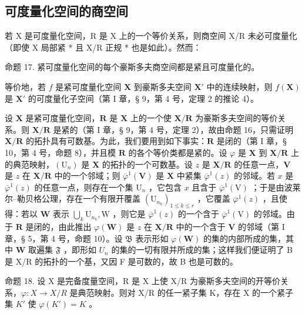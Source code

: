 \subsection{可度量化空间的商空间}

若 X 是可度量化空间，R 是 X 上的一个等价关系，则商空间 X/R 未必可度量化（即使 X 局部紧 * 且 X/R 正规 * 也是如此）。然而：

命题 17. 紧可度量化空间的每个豪斯多夫商空间都是紧且可度量化的。

等价地，若 \(f\) 是紧可度量化空间 \(\mathbf{X}\) 到豪斯多夫空间 \(\mathbf{X}'\) 中的连续映射，则 \(f(\mathbf{X})\) 是 \(\mathbf{X}'\) 的可度量化子空间（第 I 章，§ 9，第 4 号，定理 2 的推论 4）。

设 \(\mathbf{X}\) 是紧可度量化空间，\(\mathbf{R}\) 是 \(\mathbf{X}\) 上的一个使 \(\mathbf{X} / \mathbf{R}\) 为豪斯多夫空间的等价关系。则 \(\mathbf{X} / \mathbf{R}\) 是紧的（第 I 章，§ 9，第 4 号，定理 2），故由命题 16，只需证明 \(\mathbf{X} / \mathbf{R}\) 的拓扑具有可数基。为此，我们要用到如下事实：\(\mathbf{R}\) 是闭的（第 I 章，§ 10，第 4 号，命题 8），并且模 \(\mathbf{R}\) 的各个等价类都是紧的。设 \(\varphi\) 是 \(\mathbf{X}\) 到 \(\mathbf{X} / \mathbf{R}\) 上的典范映射，\((\mathrm{U}_n)\) 是 \(\mathbf{X}\) 的拓扑的一个可数基。设 \(z\) 是 \(\mathbf{X} / \mathbf{R}\) 的任意一点，\(\mathbf{V}\) 是 \(z\) 在 \(\mathbf{X} / \mathbf{R}\) 中的一个邻域；则 \(\overline{\varphi}^1 (\mathbf{V})\) 是 \(\mathbf{X}\) 中紧集 \(\overline{\varphi}^1 (z)\) 的邻域。若 \(x\) 是 \(\overline{\varphi}^1 (z)\) 的任意一点，则存在一个集 \(\mathrm{U}_n\) ，它包含 \(x\) 且含于 \(\overline{\varphi}^1 (\mathrm{V})\) ；于是由波莱尔–勒贝格公理，存在一个有限开覆盖 \((\mathrm{U}_{n_k})_{1\leqslant k\leqslant r}\) ，它覆盖 \(\overline{\varphi}^1 (z)\) ，且使得：若以 \(\mathbf{W}\) 表示 \(\bigcup_{k}\mathrm{U}_{n_k},\mathrm{W}\) ，则它是 \(\overline{\varphi}^1 (z)\) 的一个含于 \(\overline{\varphi}^1 (\mathrm{V})\) 的邻域。由于 \(\mathbf{R}\) 是闭的，由此推出 \(\varphi (\mathbf{W})\) 是 \(z\) 在 \(\mathbf{X} / \mathbf{R}\) 中的一个含于 \(\mathbf{V}\) 的邻域（第 I 章，§ 5，第 4 号，命题 10）。设 \(\mathfrak{B}\) 表示形如 \(\varphi (\mathbf{W})\) 的集的内部所成的集，其中 \(\mathbf{W}\) 取遍集 \(\mathfrak{F}\) ，即形如 \(U_{n}\) 的集的一切有限并所成的集；这样我们便证明了 B 是 X/R 的拓扑的一个基，又因 F 是可数的，故 B 也是可数的。

命题 18. 设 X 是完备度量空间，R 是 X 上使 X/R 为豪斯多夫空间的开等价关系，\(\varphi: X \to X/R\) 是典范映射。则对 X/R 的任一紧子集 K，存在 X 的一个紧子集 \(K'\) 使 \(\varphi(K') = K\) 。

